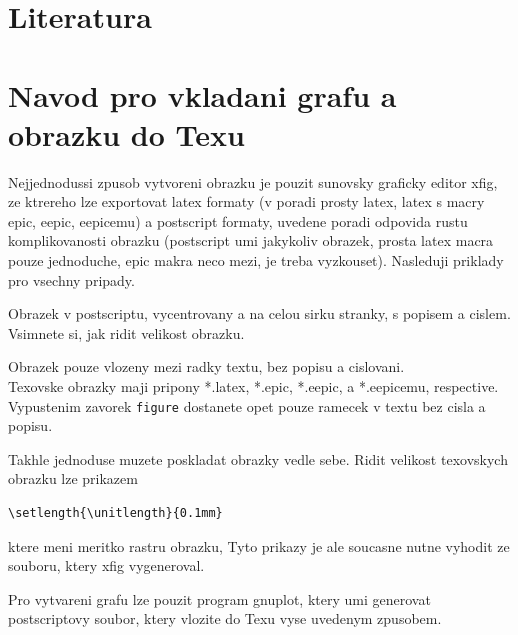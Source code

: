 \documentclass[a4paper]{article}
\begin{document}
\section{Literatura}

\appendix

\section{Navod pro vkladani grafu a obrazku do Texu}

Nejjednodussi zpusob vytvoreni obrazku je pouzit sunovsky graficky editor xfig,
ze ktrereho lze exportovat latex formaty (v poradi prosty latex, 
latex s macry epic, eepic, eepicemu) a postscript formaty,
uvedene poradi odpovida rustu komplikovanosti obrazku
(postscript umi jakykoliv obrazek, prosta latex macra pouze jednoduche,
epic makra neco mezi, je treba vyzkouset). Nasleduji priklady
pro vsechny pripady. 

Obrazek v postscriptu, vycentrovany a na celou sirku stranky, 
s popisem a cislem. Vsimnete si, jak ridit velikost obrazku.

Obrazek pouze vlozeny mezi radky textu, bez popisu a cislovani.\\

Texovske obrazky maji pripony *.latex, *.epic, *.eepic, a *.eepicemu, respective. 
% 
Vypustenim zavorek {\tt figure} dostanete opet pouze ramecek 
v textu bez cisla a popisu. 

Takhle jednoduse muzete poskladat obrazky vedle sebe.
Ridit velikost texovskych obrazku lze prikazem
\begin{verbatim}
\setlength{\unitlength}{0.1mm}
\end{verbatim}
ktere meni meritko rastru obrazku, Tyto prikazy je ale soucasne 
nutne vyhodit ze souboru, ktery xfig vygeneroval.

Pro vytvareni grafu lze pouzit program gnuplot, ktery umi generovat postscriptovy soubor, ktery vlozite
do Texu vyse uvedenym zpusobem.
\end{document}

